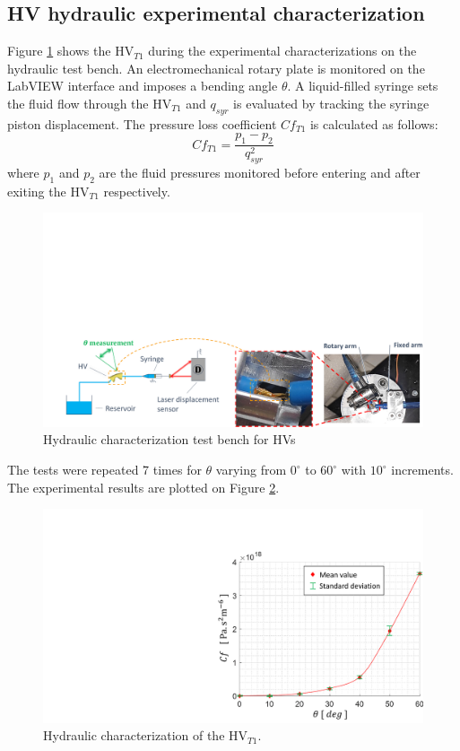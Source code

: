 \documentclass[3p,twocolumn,preprint]{elsarticle}
\begin{document}
	\subsection{HV hydraulic experimental characterization}	
	\label{subsec:HV hydraulic test bench presentation}
Figure \ref{fig:essais_hydraulique_VH} shows the HV$_{T1}$ during the experimental characterizations on the hydraulic test bench. An electromechanical rotary plate is monitored on the LabVIEW interface and imposes a bending angle $\theta$. A liquid-filled syringe sets the fluid flow through the HV$_{T1}$ and $q_{syr}$ is evaluated by tracking the syringe piston displacement. The pressure loss coefficient $Cf_{T1}$ is calculated as \mbox{follows:}
\begin{equation}
	Cf_{T1} = \dfrac{p_1-p_2}{q_{syr}^2}
\end{equation}
where $p_1$ and $p_2$ are the fluid pressures monitored before entering and after exiting the HV$_{T1}$ respectively.
\begin{figure}[!htb]
\begin{center}
	\captionsetup{justification=centering} 
	\includegraphics[trim={2cm 0cm 0cm 11cm},clip,width=.8\textwidth]{figures/essais_hydraulique_VH.pdf}
	\caption{Hydraulic characterization test bench for HVs}
	\label{fig:essais_hydraulique_VH}
\end{center}	
\end{figure}    
The tests were repeated 7 times for $\theta$ varying from $0^{\circ}$ to $60^{\circ}$ with $10^{\circ}$ increments. The experimental results are plotted on Figure \ref{fig:resultats_essais_hydraulique_VH_D1mm}.
\begin{figure}[!htbp]
\centering
	\captionsetup{justification=centering}
	\includegraphics[trim={15.5cm 0cm 0cm 3.6cm},clip,width=0.6\linewidth]{figures/resultats_essais_hydraulique_VH_D1mm.pdf}
	\caption{Hydraulic characterization of the HV$_{T1}$.}
	\label{fig:resultats_essais_hydraulique_VH_D1mm}
\end{figure}
\end{document}
